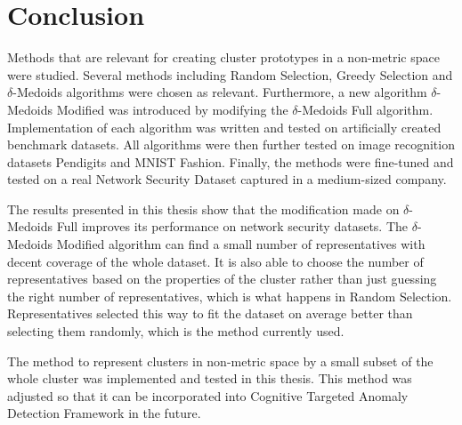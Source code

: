\documentclass[thesis=B,english]{FITthesis}[2012/10/20]
\begin{document}


\chapter{Conclusion}

Methods that are relevant for creating cluster prototypes in a non-metric space were studied.
Several methods including Random Selection, Greedy Selection and $\delta$-Medoids algorithms were chosen as relevant.
Furthermore, a new algorithm $\delta$-Medoids Modified was introduced by modifying the $\delta$-Medoids Full algorithm.
Implementation of each algorithm was written and tested on artificially created benchmark datasets.
All algorithms were then further tested on image recognition datasets Pendigits and MNIST Fashion.
Finally, the methods were fine-tuned and tested on a real Network Security Dataset captured in a medium-sized company.

The results presented in this thesis show that the modification made on $\delta$-Medoids Full improves its performance on network security datasets.
The $\delta$-Medoids Modified algorithm can find a small number of representatives with decent coverage of the whole dataset.
It is also able to choose the number of representatives based on the properties of the cluster rather than just guessing the right number of representatives, which is what happens in Random Selection.
Representatives selected this way to fit the dataset on average better than selecting them randomly, which is the method currently used.

The method to represent clusters in non-metric space by a small subset of the whole cluster was implemented and tested in this thesis.
This method was adjusted so that it can be incorporated into Cognitive Targeted Anomaly Detection Framework in the future.

\end{document}
